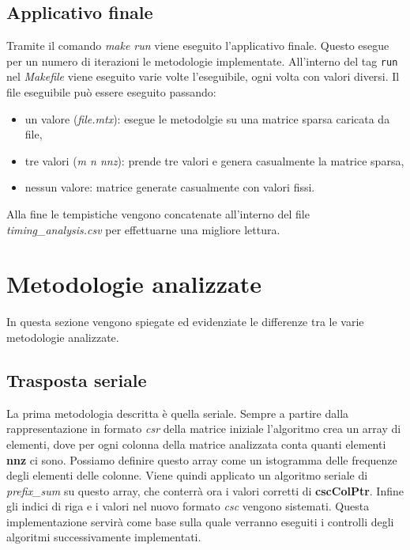 \documentclass[]{IEEEtran}
\begin{document}
	\subsection{Applicativo finale}
	\label{applicativo-finale}
	Tramite il comando \textit{make run} viene eseguito l'applicativo finale. Questo esegue per un numero di iterazioni le metodologie implementate. All'interno del tag \texttt{run} nel \textit{Makefile} viene eseguito varie volte l'eseguibile, ogni volta con valori diversi.\newline
	Il file eseguibile può essere eseguito passando:
	\begin{itemize}
		\item un valore (\textit{file.mtx}): esegue le metodolgie su una matrice sparsa caricata da file,
		\item tre valori (\textit{m n nnz}): prende tre valori e genera casualmente la matrice sparsa,
		\item nessun valore: matrice generate casualmente con valori fissi.
	\end{itemize}
	Alla fine le tempistiche vengono concatenate all'interno del file \textit{timing\_analysis.csv} per effettuarne una migliore lettura.


\section{Metodologie analizzate}
\label{metodologie}
	In questa sezione vengono spiegate ed evidenziate le differenze tra le varie metodologie analizzate. 
		
	\subsection{Trasposta seriale}
	La prima metodologia descritta è quella seriale. Sempre a partire dalla rappresentazione in formato \textit{csr} della matrice iniziale l'algoritmo crea un array di elementi, dove per ogni colonna della matrice analizzata conta quanti elementi \textbf{nnz} ci sono. Possiamo definire questo array come un istogramma delle frequenze degli elementi delle colonne. Viene quindi applicato un algoritmo seriale di \textit{prefix\_sum} su questo array, che conterrà ora i valori corretti di \textbf{cscColPtr}. Infine gli indici di riga e i valori nel nuovo formato \textit{csc} vengono sistemati.\newline
	Questa implementazione servirà come base sulla quale verranno eseguiti i controlli degli algoritmi successivamente implementati.
	
\end{document}
